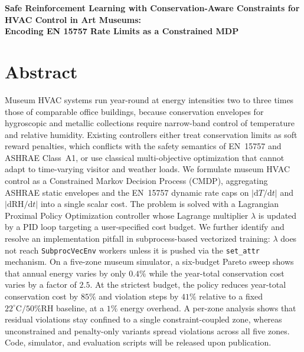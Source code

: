 \documentclass[11pt,a4paper]{article}
\begin{document}


\begin{center}
\Large\bfseries
Safe Reinforcement Learning with Conservation-Aware Constraints
for HVAC Control in Art Museums:\\[3pt]
Encoding EN 15757 Rate Limits as a Constrained MDP
\end{center}



\section*{Abstract}

Museum HVAC systems run year-round at energy intensities two to three
times those of comparable office buildings, because conservation
envelopes for hygroscopic and metallic collections require narrow-band
control of temperature and relative humidity. Existing controllers
either treat conservation limits as soft reward penalties, which
conflicts with the safety semantics of EN~15757 and ASHRAE Class~A1,
or use classical multi-objective optimization that cannot adapt to
time-varying visitor and weather loads. We formulate museum HVAC
control as a Constrained Markov Decision Process (CMDP), aggregating
ASHRAE static envelopes and the EN~15757 dynamic rate caps on
$|\mathrm{d}T/\mathrm{d}t|$ and $|\mathrm{d}\mathrm{RH}/\mathrm{d}t|$
into a single scalar cost. The problem is solved with a Lagrangian
Proximal Policy Optimization controller whose Lagrange multiplier
$\lambda$ is updated by a PID loop targeting a user-specified cost
budget. We further identify and resolve an implementation pitfall in
subprocess-based vectorized training: $\lambda$ does not reach
\texttt{SubprocVecEnv} workers unless it is pushed via the
\texttt{set\_attr} mechanism. On a five-zone museum simulator, a
six-budget Pareto sweep shows that annual energy varies by only
$0.4\%$ while the year-total
conservation cost varies by a factor of $2.5$. At the strictest budget,
the policy reduces year-total conservation cost by $85\%$ and violation
steps by $41\%$ relative to a fixed $22^\circ\mathrm{C}/50\%\mathrm{RH}$
baseline, at a $1\%$ energy overhead. A per-zone analysis shows that
residual violations stay confined to a single constraint-coupled zone,
whereas unconstrained and penalty-only variants spread violations
across all five zones. Code, simulator, and evaluation scripts will be
released upon publication.
\end{document}
